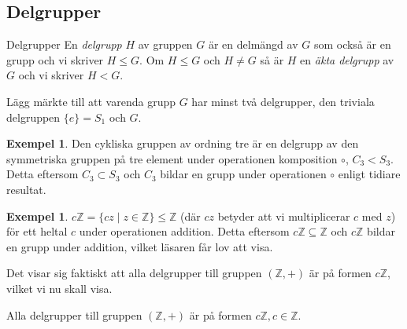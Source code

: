 \documentclass{article}
\theoremstyle{definition}
\newtheorem{exmp}[thm]{Exempel}
\begin{document}
\subsection{Delgrupper}
\begin{mydef}{Delgrupper}{}
  En \textit{delgrupp} $H$ av gruppen $G$ är en delmängd av $G$ som också är en grupp och vi 
  skriver $H \le G$. Om $H \le G$ och $H \neq G$ så är $H$ en \textit{äkta delgrupp} av $G$
  och vi skriver $H < G$.
\end{mydef}
Lägg märkte till att varenda grupp $G$ har minst två delgrupper, den triviala delgruppen 
$\{e\} = S_1$ och $G$.
\begin{exmp}
  Den cykliska gruppen av ordning tre är en delgrupp av den symmetriska gruppen på tre element
  under operationen komposition $\circ$,
  $C_3 < S_3$. Detta eftersom $C_3 \subset S_3$ och $C_3$ bildar en grupp 
  under operationen $\circ$ enligt tidiare resultat.
\end{exmp}
\begin{exmp}
  $c \mathbb{Z} = \{cz \; | \; z \in \mathbb{Z}\} \le \mathbb{Z}$ (där $cz$ betyder 
  att vi multiplicerar $c$ med $z$) för ett heltal $c$ under operationen 
  addition. 
  Detta eftersom $c \mathbb{Z} \subseteq \mathbb{Z}$ och $c \mathbb{Z}$ bildar en 
  grupp under addition, vilket läsaren får lov att visa.
\end{exmp}
Det visar sig faktiskt att alla delgrupper till gruppen $(\mathbb{Z}, +)$ 
är på formen $c \mathbb{Z}$, vilket vi nu skall visa. 
\begin{mytheo}{}{}
  Alla delgrupper till gruppen $(\mathbb{Z}, +)$ 
  är på formen $c \mathbb{Z}, c \in \mathbb{Z}$.
\end{mytheo}
\end{document}
